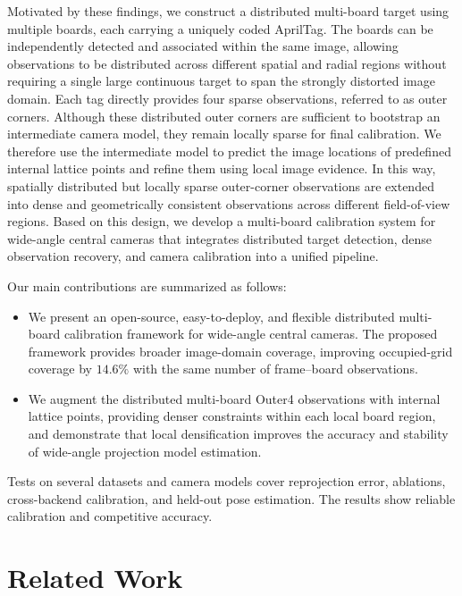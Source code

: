 \documentclass[letterpaper, 10 pt, conference]{ieeeconf}  %
\begin{document}
Motivated by these findings, we construct a distributed multi-board
target using multiple boards, each carrying a uniquely coded AprilTag.
The boards can be independently detected and associated within the same
image, allowing observations to be distributed across different spatial
and radial regions without requiring a single large continuous target to
span the strongly distorted image domain. Each tag directly provides
four sparse observations, referred to as outer corners. Although
these distributed outer corners are sufficient to bootstrap an
intermediate camera model, they remain locally sparse for final
calibration. We therefore use the intermediate model to predict the
image locations of predefined internal lattice points and refine them
using local image evidence. In this way, spatially distributed but
locally sparse outer-corner observations are extended into dense and
geometrically consistent observations across different field-of-view
regions. Based on this design, we develop a multi-board calibration
system for wide-angle central cameras that integrates distributed target
detection, dense observation recovery, and camera calibration into a
unified pipeline.

Our main contributions are summarized as follows:

\begin{itemize}
\setlength{\itemsep}{1pt}
\setlength{\parskip}{0pt}
\setlength{\parsep}{0pt}
\item We present an open-source, easy-to-deploy, and flexible distributed multi-board
calibration framework for wide-angle central cameras. The proposed framework
provides broader image-domain coverage, improving occupied-grid coverage
by $14.6\%$ with the same number of frame--board observations.

\item We augment the distributed multi-board Outer4 observations with
internal lattice points, providing denser constraints within each local
board region, and demonstrate that local densification improves the
accuracy and stability of wide-angle projection model estimation.
\end{itemize}

Tests on several datasets and camera models cover reprojection error, ablations,
cross-backend calibration, and held-out pose estimation. The results show
reliable calibration and competitive accuracy.

\section{Related Work}
\end{document}
